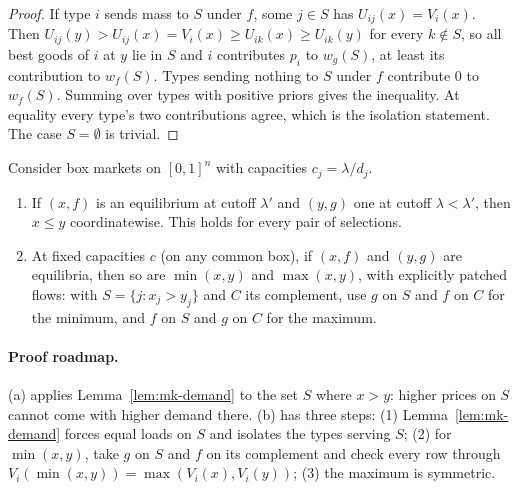 \begin{proof}
If type $i$ sends mass to $S$ under $f$, some $j\in S$ has $U_{ij}(x)=V_i(x)$. Then
$U_{ij}(y)>U_{ij}(x)=V_i(x)\ge U_{ik}(x)\ge U_{ik}(y)$ for every $k\notin S$, so all best goods of $i$
at $y$ lie in $S$ and $i$ contributes $p_i$ to $w_g(S)$, at least its contribution to $w_f(S)$. Types
sending nothing to $S$ under $f$ contribute $0$ to $w_f(S)$. Summing over types with positive priors
gives the inequality. At equality every type's two contributions agree, which is the isolation
statement. The case $S=\emptyset$ is trivial.
\end{proof}

\begin{proposition}\label{prop:mk-lattice}
\statusrefereed
Consider box markets on $[0,1]^n$ with capacities $c_j=\lambda/d_j$.
\begin{enumerate}[nosep,label=(\alph*)]
\item If $(x,f)$ is an equilibrium at cutoff $\lambda'$ and $(y,g)$ one at cutoff $\lambda<\lambda'$,
then $x\le y$ coordinatewise. This holds for every pair of selections.
\item At fixed capacities $c$ (on any common box), if $(x,f)$ and $(y,g)$ are equilibria, then so are
$\min(x,y)$ and $\max(x,y)$, with explicitly patched flows: with $S=\{j:x_j>y_j\}$ and $C$ its
complement, use $g$ on $S$ and $f$ on $C$ for the minimum, and $f$ on $S$ and $g$ on $C$ for the maximum.
\end{enumerate}
\end{proposition}

\paragraph{Proof roadmap.} (a) applies Lemma~\ref{lem:mk-demand} to the set $S$ where $x>y$: higher prices on
$S$ cannot come with higher demand there. (b) has three steps: (1) Lemma~\ref{lem:mk-demand} forces equal
loads on $S$ and isolates the types serving $S$; (2) for $\min(x,y)$, take $g$ on $S$ and $f$ on its
complement and check every row through $V_i(\min(x,y))=\max(V_i(x),V_i(y))$; (3) the maximum is
symmetric.

